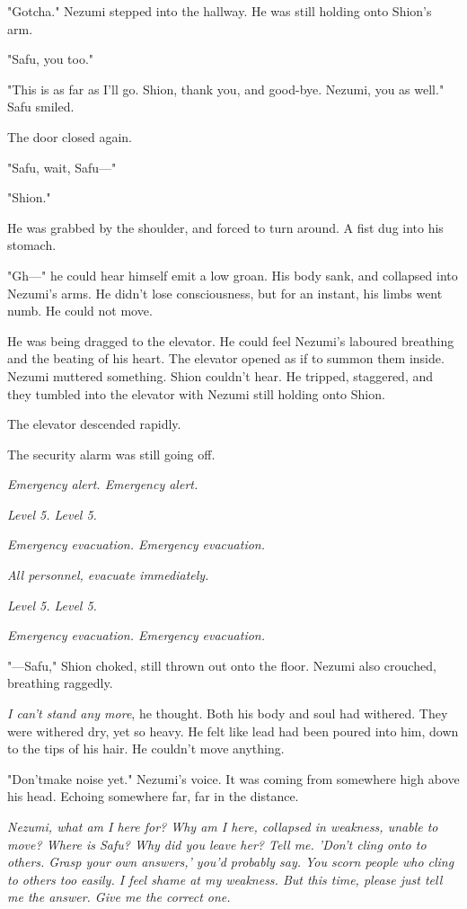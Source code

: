 "Gotcha." Nezumi stepped into the hallway. He was still holding onto
Shion's arm.

"Safu, you too."

"This is as far as I'll go. Shion, thank you, and good-bye. Nezumi, you
as well." Safu smiled.

The door closed again.

"Safu, wait, Safu---"

"Shion."

He was grabbed by the shoulder, and forced to turn around. A fist dug
into his stomach.

"Gh---" he could hear himself emit a low groan. His body sank, and
collapsed into Nezumi's arms. He didn't lose consciousness, but for an
instant, his limbs went numb. He could not move.

He was being dragged to the elevator. He could feel Nezumi's laboured
breathing and the beating of his heart. The elevator opened as if to
summon them inside. Nezumi muttered something. Shion couldn't hear. He
tripped, staggered, and they tumbled into the elevator with Nezumi still
holding onto Shion.

The elevator descended rapidly.

The security alarm was still going off.

\emph{Emergency alert. Emergency alert.}

\emph{Level 5. Level 5.}

\emph{Emergency evacuation. Emergency evacuation.}

\emph{All personnel, evacuate immediately.}

\emph{Level 5. Level 5.}

\emph{Emergency evacuation. Emergency evacuation.}

"---Safu," Shion choked, still thrown out onto the floor. Nezumi also
crouched, breathing raggedly.

\emph{I can't stand any more}, he thought. Both his body and soul had withered.
They were withered dry, yet so heavy. He felt like lead had been poured
into him, down to the tips of his hair. He couldn't move anything.

"Don't\el make noise yet." Nezumi's voice. It was coming from somewhere
high above his head. Echoing somewhere far, far in the distance.

\emph{Nezumi, what am I here for? Why am I here, collapsed in weakness, unable
to move? Where is Safu? Why did you leave her? Tell me. 'Don't cling
onto to others. Grasp your own answers,' you'd probably say. You scorn
people who cling to others too easily. I feel shame at my weakness. But
this time, please just tell me the answer. Give me the correct one.}

